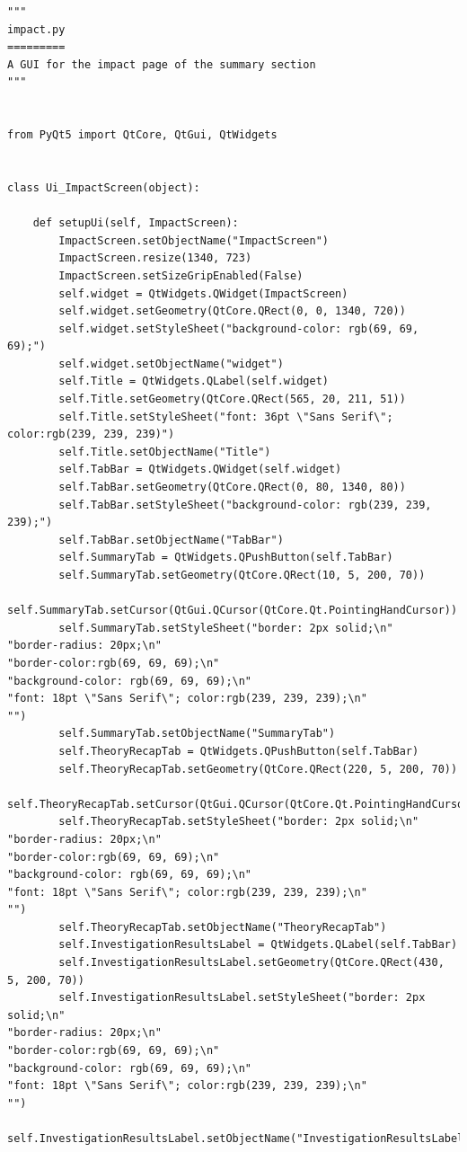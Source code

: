 \documentclass{article}
\begin{document}
\begin{lstlisting}
"""
impact.py
=========
A GUI for the impact page of the summary section
"""


from PyQt5 import QtCore, QtGui, QtWidgets


class Ui_ImpactScreen(object):

    def setupUi(self, ImpactScreen):
        ImpactScreen.setObjectName("ImpactScreen")
        ImpactScreen.resize(1340, 723)
        ImpactScreen.setSizeGripEnabled(False)
        self.widget = QtWidgets.QWidget(ImpactScreen)
        self.widget.setGeometry(QtCore.QRect(0, 0, 1340, 720))
        self.widget.setStyleSheet("background-color: rgb(69, 69, 69);")
        self.widget.setObjectName("widget")
        self.Title = QtWidgets.QLabel(self.widget)
        self.Title.setGeometry(QtCore.QRect(565, 20, 211, 51))
        self.Title.setStyleSheet("font: 36pt \"Sans Serif\"; color:rgb(239, 239, 239)")
        self.Title.setObjectName("Title")
        self.TabBar = QtWidgets.QWidget(self.widget)
        self.TabBar.setGeometry(QtCore.QRect(0, 80, 1340, 80))
        self.TabBar.setStyleSheet("background-color: rgb(239, 239, 239);")
        self.TabBar.setObjectName("TabBar")
        self.SummaryTab = QtWidgets.QPushButton(self.TabBar)
        self.SummaryTab.setGeometry(QtCore.QRect(10, 5, 200, 70))
        self.SummaryTab.setCursor(QtGui.QCursor(QtCore.Qt.PointingHandCursor))
        self.SummaryTab.setStyleSheet("border: 2px solid;\n"
"border-radius: 20px;\n"
"border-color:rgb(69, 69, 69);\n"
"background-color: rgb(69, 69, 69);\n"
"font: 18pt \"Sans Serif\"; color:rgb(239, 239, 239);\n"
"")
        self.SummaryTab.setObjectName("SummaryTab")
        self.TheoryRecapTab = QtWidgets.QPushButton(self.TabBar)
        self.TheoryRecapTab.setGeometry(QtCore.QRect(220, 5, 200, 70))
        self.TheoryRecapTab.setCursor(QtGui.QCursor(QtCore.Qt.PointingHandCursor))
        self.TheoryRecapTab.setStyleSheet("border: 2px solid;\n"
"border-radius: 20px;\n"
"border-color:rgb(69, 69, 69);\n"
"background-color: rgb(69, 69, 69);\n"
"font: 18pt \"Sans Serif\"; color:rgb(239, 239, 239);\n"
"")
        self.TheoryRecapTab.setObjectName("TheoryRecapTab")
        self.InvestigationResultsLabel = QtWidgets.QLabel(self.TabBar)
        self.InvestigationResultsLabel.setGeometry(QtCore.QRect(430, 5, 200, 70))
        self.InvestigationResultsLabel.setStyleSheet("border: 2px solid;\n"
"border-radius: 20px;\n"
"border-color:rgb(69, 69, 69);\n"
"background-color: rgb(69, 69, 69);\n"
"font: 18pt \"Sans Serif\"; color:rgb(239, 239, 239);\n"
"")
        self.InvestigationResultsLabel.setObjectName("InvestigationResultsLabel")

\end{lstlisting}
\end{document}
